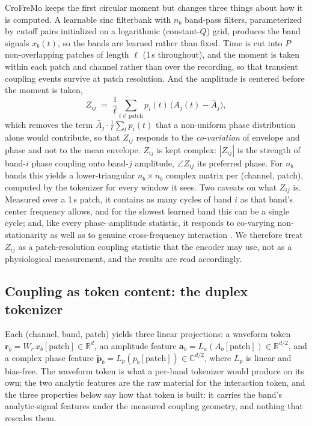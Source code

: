 CroFreMo keeps the first circular moment but changes three things about how
it is computed. A learnable sinc filterbank \citep{ravanelli2018sincnet}
with $n_b$ band-pass filters, parameterized by cutoff pairs initialized on
a logarithmic (constant-$Q$) grid, produces the band signals $x_b(t)$, so
the bands are learned rather than fixed. Time is cut into $P$
non-overlapping patches of length $\ell$ (1\,s throughout), and the moment is
taken within each patch and channel rather than over the recording, so
that transient coupling events survive at patch resolution. And the
amplitude is centered before the moment is taken,
\begin{equation}
Z_{ij} \;=\; \frac{1}{\ell}\sum_{t \in \text{patch}}
p_i(t)\,\bigl(A_j(t) - \bar A_j\bigr),
\label{eq:mvl}
\end{equation}
which removes the term $\bar A_j \cdot \frac{1}{\ell}\sum_t p_i(t)$ that a
non-uniform phase distribution alone would contribute, so that $Z_{ij}$
responds to the \emph{co-variation} of envelope and phase and not to
the mean envelope. $Z_{ij}$ is kept complex: $|Z_{ij}|$ is the strength of
band-$i$ phase coupling onto band-$j$ amplitude, $\angle Z_{ij}$ its
preferred phase. For $n_b$ bands this yields a lower-triangular
$n_b \times n_b$ complex matrix per (channel, patch), computed by the
tokenizer for every window it sees. Two caveats on what $Z_{ij}$ is.
Measured over a 1\,s patch, it contains as many cycles of band $i$ as
that band's center frequency allows, and for the slowest learned band
this can be a single cycle; and, like every phase--amplitude statistic,
it responds to co-varying non-stationarity as well as to genuine
cross-frequency interaction \citep{aru2015untangling}. We therefore treat
$Z_{ij}$ as a patch-resolution coupling statistic that the encoder may
use, not as a physiological measurement, and the results are read
accordingly.

\subsection{Coupling as token content: the duplex tokenizer}
\label{sec:tokenizer}

Each (channel, band, patch) yields three linear projections: a waveform
token $\mathbf{r}_b = W_r\,x_b[\text{patch}] \in \mathbb{R}^d$, an
amplitude feature
$\mathbf{a}_b = L_a(A_b[\text{patch}]) \in \mathbb{R}^{d/2}$, and a complex
phase feature
$\tilde{\mathbf{p}}_b = L_p(p_b[\text{patch}]) \in \mathbb{C}^{d/2}$, where
$L_p$ is linear and bias-free. The waveform token is what a per-band
tokenizer would produce on its own; the two analytic features are the raw
material for the interaction token, and the three properties below say how
that token is built: it carries the band's analytic-signal features under the
measured coupling geometry, and nothing that rescales them.

